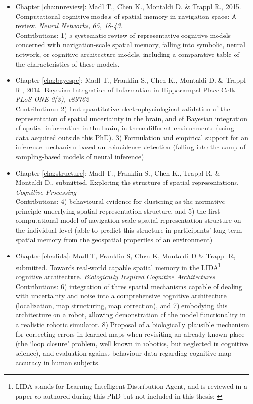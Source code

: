 \begin{itemize}
	\item Chapter \ref{cha:nnreview}: Madl T., Chen K., Montaldi D. \& Trappl R., 2015. Computational cognitive models of spatial memory in navigation space: A review. \textit{Neural Networks, 65, 18-43.}
	\\ Contributions: 1) a systematic review of representative cognitive models concerned with navigation-scale spatial memory, falling into symbolic, neural network, or cognitive architecture models, including a comparative table of the characteristics of these models.
	\item Chapter \ref{cha:bayespc}: Madl T., Franklin S., Chen K., Montaldi D. \& Trappl R., 2014. Bayesian Integration of Information in Hippocampal Place Cells. \textit{PLoS ONE 9(3), e89762}
	\\ Contributions: 2) first quantitative electrophysiological validation of the representation of spatial uncertainty in the brain, and of Bayesian integration of spatial information in the brain, in three different environments (using data acquired outside this PhD). 3) Formulation and empirical support for an inference mechanism based on coincidence detection (falling into the camp of sampling-based models of neural inference)
	\item Chapter \ref{cha:structure}: Madl T., Franklin S., Chen K., Trappl R. \& Montaldi D., submitted. Exploring the structure of spatial representations. \textit{Cognitive Processing}
	\\ Contributions: 4) behavioural evidence for clustering as the normative principle underlying spatial representation structure, and 5) the first computational model of navigation-scale spatial representation structure on the individual level (able to predict this structure in participants' long-term spatial memory from the geospatial properties of an environment)
	\item Chapter \ref{cha:lida}: Madl T, Franklin S, Chen K, Montaldi D \& Trappl R, submitted. Towards real-world capable spatial memory in the LIDA\footnote{LIDA stands for Learning Intelligent Distribution Agent, and is reviewed in a paper co-authored during this PhD but not included in this thesis: \citep{franklin2013lida}} cognitive architecture. \textit{Biologically Inspired Cognitive Architectures}
	\\ Contributions: 6) integration of three spatial mechanisms capable of dealing with uncertainty and noise into a comprehensive cognitive architecture (localization, map structuring, map correction), and 7) embodying this architecture on a robot, allowing demonstration of the model functionality in a realistic robotic simulator. 8) Proposal of a biologically plausible mechanism for correcting errors in learned maps when revisiting an already known place (the `loop closure' problem, well known in robotics, but neglected in cognitive science), and evaluation against behaviour data regarding cognitive map accuracy in human subjects.
\end{itemize}

